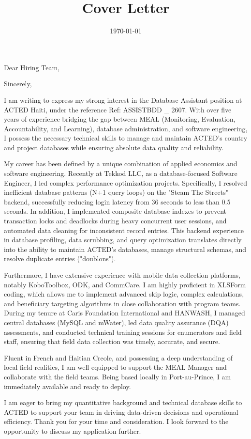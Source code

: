\documentclass[11pt,a4paper,sans]{moderncv}
\title{Cover Letter}
\begin{document}
\date{\today}
\opening{Dear Hiring Team,}
\closing{Sincerely,}

\makelettertitle

I am writing to express my strong interest in the Database Assistant position at ACTED Haiti, under the reference Ref: ASSISTBDD \_ 2607. With over five years of experience bridging the gap between MEAL (Monitoring, Evaluation, Accountability, and Learning), database administration, and software engineering, I possess the necessary technical skills to manage and maintain ACTED's country and project databases while ensuring absolute data quality and reliability.

My career has been defined by a unique combination of applied economics and software engineering. Recently at Tekkod LLC, as a database-focused Software Engineer, I led complex performance optimization projects. Specifically, I resolved inefficient database patterns (N+1 query loops) on the "Steam The Streets" backend, successfully reducing login latency from 36 seconds to less than 0.5 seconds. In addition, I implemented composite database indexes to prevent transaction locks and deadlocks during heavy concurrent user sessions, and automated data cleaning for inconsistent record entries. This backend experience in database profiling, data scrubbing, and query optimization translates directly into the ability to maintain ACTED's databases, manage structural schemas, and resolve duplicate entries ("doublons").

Furthermore, I have extensive experience with mobile data collection platforms, notably KoboToolbox, ODK, and CommCare. I am highly proficient in XLSForm coding, which allows me to implement advanced skip logic, complex calculations, and beneficiary targeting algorithms in close collaboration with program teams. During my tenure at Caris Foundation International and HANWASH, I managed central databases (MySQL and mWater), led data quality assurance (DQA) assessments, and conducted technical training sessions for enumerators and field staff, ensuring that field data collection was timely, accurate, and secure.

Fluent in French and Haitian Creole, and possessing a deep understanding of local field realities, I am well-equipped to support the MEAL Manager and collaborate with the field teams. Being based locally in Port-au-Prince, I am immediately available and ready to deploy.

I am eager to bring my quantitative background and technical database skills to ACTED to support your team in driving data-driven decisions and operational efficiency. Thank you for your time and consideration. I look forward to the opportunity to discuss my application further.

\makeletterclosing
\end{document}

